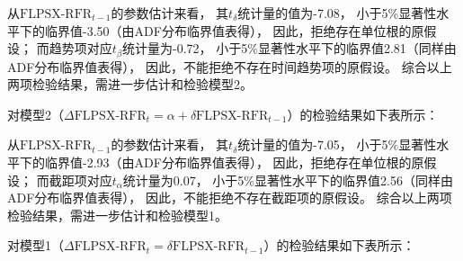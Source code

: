 \documentclass[UTF8]{ctexart}
\begin{document}
从$\text{FLPSX-RFR}_{t-1}$的参数估计来看，
其$t_{\delta}$统计量的值为-7.08，
小于5\%显著性水平下的临界值-3.50（由ADF分布临界值表得），
因此，拒绝存在单位根的原假设；
而趋势项对应$t_{\beta}$统计量为-0.72，
小于5\%显著性水平下的临界值2.81（同样由ADF分布临界值表得），
因此，不能拒绝不存在时间趋势项的原假设。
综合以上两项检验结果，需进一步估计和检验模型2。

对模型2（$\Delta \text{FLPSX-RFR}_{t} = \alpha + \delta  \text{FLPSX-RFR}_{t-1}$）的检验结果如下表所示：



从$\text{FLPSX-RFR}_{t-1}$的参数估计来看，
其$t_{\delta}$统计量的值为-7.05，
小于5\%显著性水平下的临界值-2.93（由ADF分布临界值表得），
因此，拒绝存在单位根的原假设；
而截距项对应$t_{\alpha}$统计量为0.07，
小于5\%显著性水平下的临界值2.56（同样由ADF分布临界值表得），
因此，不能拒绝不存在截距项的原假设。
综合以上两项检验结果，需进一步估计和检验模型1。

对模型1（$\Delta \text{FLPSX-RFR}_{t} = \delta \text{FLPSX-RFR}_{t-1}$）的检验结果如下表所示：


\end{document}
